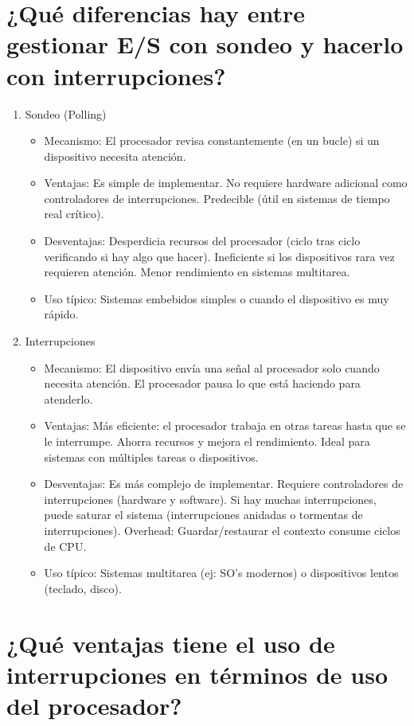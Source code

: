 \documentclass{article}
\begin{document}
\section{¿Qué diferencias hay entre gestionar E/S con sondeo y hacerlo con interrupciones?}

\begin{enumerate}
\item Sondeo (Polling)
\begin{itemize}
\item Mecanismo: El procesador revisa constantemente (en un bucle) si un dispositivo necesita atención.
\item Ventajas: Es simple de implementar. No requiere hardware adicional como controladores de interrupciones. Predecible (útil en sistemas de tiempo real crítico).
\item Desventajas: Desperdicia recursos del procesador (ciclo tras ciclo verificando si hay algo que hacer). Ineficiente si los dispositivos rara vez requieren atención. Menor rendimiento en sistemas multitarea.
\item Uso típico: Sistemas embebidos simples o cuando el dispositivo es muy rápido.
\end{itemize}

\newpage

\item Interrupciones
\begin{itemize}
\item Mecanismo: El dispositivo envía una señal al procesador solo cuando necesita atención. El procesador pausa lo que está haciendo para atenderlo.
\item Ventajas: Más eficiente: el procesador trabaja en otras tareas hasta que se le interrumpe. Ahorra recursos y mejora el rendimiento. Ideal para sistemas con múltiples tareas o dispositivos.
\item Desventajas: Es más complejo de implementar. Requiere controladores de interrupciones (hardware y software). Si hay muchas interrupciones, puede saturar el sistema (interrupciones anidadas o tormentas de interrupciones). Overhead: Guardar/restaurar el contexto consume ciclos de CPU.
\item Uso típico: Sistemas multitarea (ej: SO's modernos) o dispositivos lentos (teclado, disco).
\end{itemize}
\end{enumerate}

\section{¿Qué ventajas tiene el uso de interrupciones en términos de uso del procesador?}
\end{document}
